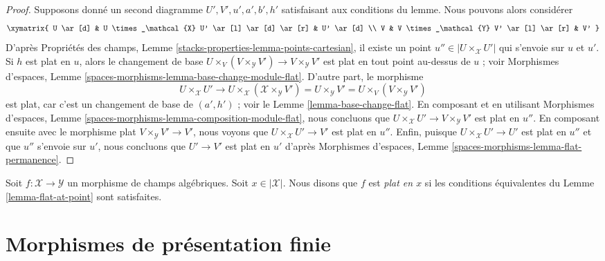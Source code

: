 \begin{proof}
Supposons donné un second diagramme $U', V', u', a', b', h'$ satisfaisant
aux conditions du lemme. Nous pouvons alors considérer
$$
\xymatrix{
U \ar[d] & U \times_\mathcal{X} U' \ar[l] \ar[d] \ar[r] & U' \ar[d] \\
V & V \times_\mathcal{Y} V' \ar[l] \ar[r] & V'
}
$$
D'après Propriétés des champs, Lemme
\ref{stacks-properties-lemma-points-cartesian}, il existe un point
$u'' \in |U \times_\mathcal{X} U'|$ qui s'envoie sur $u$ et $u'$.
Si $h$ est plat en $u$, alors le changement de base
$U \times_V (V \times_\mathcal{Y} V') \to V \times_\mathcal{Y} V'$
est plat en tout point au-dessus de $u$ ; voir Morphismes d'espaces, Lemme
\ref{spaces-morphisms-lemma-base-change-module-flat}. D'autre part, le
morphisme
$$
U \times_\mathcal{X} U' \to
U \times_\mathcal{X} (\mathcal{X} \times_\mathcal{Y} V') =
U \times_\mathcal{Y} V' =
U \times_V (V \times_\mathcal{Y} V')
$$
est plat, car c'est un changement de base de $(a', h')$ ; voir le
Lemme \ref{lemma-base-change-flat}. En composant et en utilisant Morphismes
d'espaces, Lemme \ref{spaces-morphisms-lemma-composition-module-flat}, nous
concluons que $U \times_\mathcal{X} U' \to V \times_\mathcal{Y} V'$ est plat
en $u''$. En composant ensuite avec le morphisme plat
$V \times_\mathcal{Y} V' \to V'$, nous voyons que
$U \times_\mathcal{X} U' \to V'$ est plat en $u''$. Enfin, puisque
$U \times_\mathcal{X} U' \to U'$ est plat en $u''$ et que $u''$ s'envoie
sur $u'$, nous concluons que $U' \to V'$ est plat en $u'$ d'après Morphismes
d'espaces, Lemme \ref{spaces-morphisms-lemma-flat-permanence}.
\end{proof}

\begin{definition}
\label{definition-flat-at-point}
Soit $f : \mathcal{X} \to \mathcal{Y}$ un morphisme de champs algébriques.
Soit $x \in |\mathcal{X}|$. Nous disons que $f$ est {\it plat en $x$} si les
conditions équivalentes du Lemme \ref{lemma-flat-at-point} sont satisfaites.
\end{definition}





\section{Morphismes de présentation finie}
\label{section-finite-presentation}

